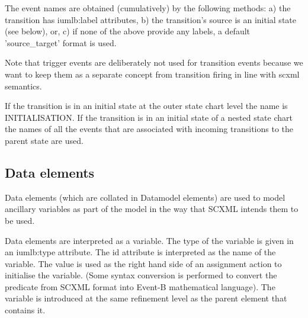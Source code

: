 The event names are obtained (cumulatively) by the 
following methods:
a)  the transition has iumlb:label attributes,
b) the transition's source is an initial state (see below), 
or,
c) if none of the above provide any labels, a default 
'source\_target' format is used.

Note that trigger events are deliberately not used for 
transition events because we want to keep them as a 
separate concept from transition firing in line with scxml 
semantics.

If the transition is in an initial state at the outer state 
chart level the name is INITIALISATION. 
If the transition is in an initial state of a nested state 
chart the names of all the events that are associated with 
incoming transitions to the parent state are used.

\subsection{Data elements}
Data elements (which are collated in Datamodel elements) 
are used to model ancillary variables as part of the model 
in the way that SCXML intends them to be used.

Data elements are interpreted as a variable. The type of 
the variable is given in an iumlb:type attribute. 
The id attribute is interpreted as the name of the 
variable. The value is used as the right hand side of an 
assignment action to initialise the variable.  (Some syntax 
conversion is performed to convert the predicate from SCXML 
format into Event-B mathematical language). The variable is 
introduced at the same refinement level as the parent 
element that contains it.



